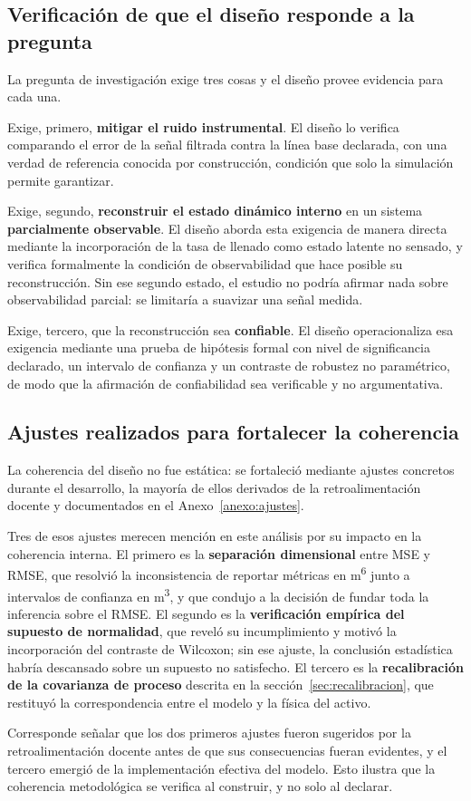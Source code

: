 \subsection{Verificación de que el diseño responde a la pregunta}

La pregunta de investigación exige tres cosas y el diseño provee evidencia para
cada una.

Exige, primero, \textbf{mitigar el ruido instrumental}. El diseño lo verifica
comparando el error de la señal filtrada contra la línea base declarada, con una
verdad de referencia conocida por construcción, condición que solo la simulación
permite garantizar.

Exige, segundo, \textbf{reconstruir el estado dinámico interno} en un sistema
\textbf{parcialmente observable}. El diseño aborda esta exigencia de manera
directa mediante la incorporación de la tasa de llenado como estado latente no
sensado, y verifica formalmente la condición de observabilidad que hace posible
su reconstrucción. Sin ese segundo estado, el estudio no podría afirmar nada
sobre observabilidad parcial: se limitaría a suavizar una señal medida.

Exige, tercero, que la reconstrucción sea \textbf{confiable}. El diseño
operacionaliza esa exigencia mediante una prueba de hipótesis formal con nivel
de significancia declarado, un intervalo de confianza y un contraste de robustez
no paramétrico, de modo que la afirmación de confiabilidad sea verificable y no
argumentativa.

\subsection{Ajustes realizados para fortalecer la coherencia}

La coherencia del diseño no fue estática: se fortaleció mediante ajustes
concretos durante el desarrollo, la mayoría de ellos derivados de la
retroalimentación docente y documentados en el Anexo~\ref{anexo:ajustes}.

Tres de esos ajustes merecen mención en este análisis por su impacto en la
coherencia interna. El primero es la \textbf{separación dimensional} entre MSE y
RMSE, que resolvió la inconsistencia de reportar métricas en
\si{\metre\tothe{6}} junto a intervalos de confianza en \si{\metre\cubed}, y que
condujo a la decisión de fundar toda la inferencia sobre el RMSE. El segundo es
la \textbf{verificación empírica del supuesto de normalidad}, que reveló su
incumplimiento y motivó la incorporación del contraste de Wilcoxon; sin ese
ajuste, la conclusión estadística habría descansado sobre un supuesto no
satisfecho. El tercero es la \textbf{recalibración de la covarianza de proceso}
descrita en la sección~\ref{sec:recalibracion}, que restituyó la
correspondencia entre el modelo y la física del activo.

Corresponde señalar que los dos primeros ajustes fueron sugeridos por la
retroalimentación docente antes de que sus consecuencias fueran evidentes, y el
tercero emergió de la implementación efectiva del modelo. Esto ilustra que la
coherencia metodológica se verifica al construir, y no solo al declarar.
